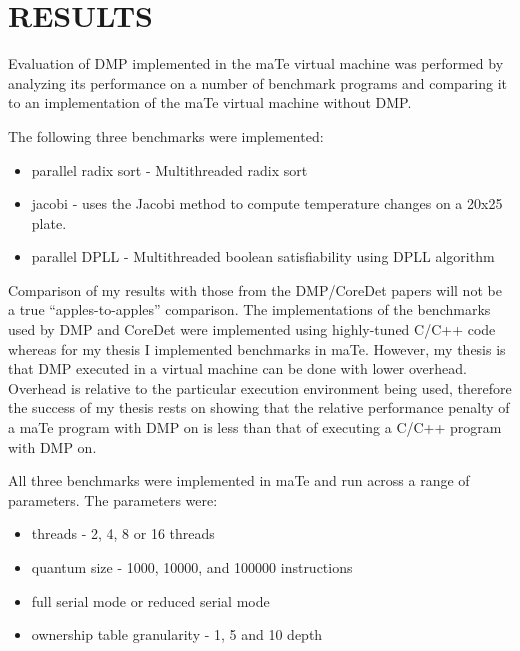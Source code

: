 \chapter{RESULTS}
\label{RESULTS}

Evaluation of DMP implemented in the maTe virtual machine was
performed by analyzing its performance on a number of benchmark
programs and comparing it to an implementation of the maTe virtual
machine without DMP.

The following three benchmarks were implemented:

\begin{itemize}
\item parallel radix sort - Multithreaded radix sort

\item jacobi - uses the Jacobi method to compute temperature changes
  on a 20x25 plate.

\item parallel DPLL - Multithreaded boolean satisfiability using DPLL
  algorithm
\end{itemize}

Comparison of my results with those from the DMP/CoreDet papers will
not be a true ``apples-to-apples'' comparison.  The implementations of
the benchmarks used by DMP \cite{dmp} and CoreDet \cite{coredet} were
implemented using highly-tuned C/C++ code whereas for my thesis I
implemented benchmarks in maTe.  However, my thesis is that DMP
executed in a virtual machine can be done with lower overhead.
Overhead is relative to the particular execution environment being
used, therefore the success of my thesis rests on showing that the
relative performance penalty of a maTe program with DMP on is less
than that of executing a C/C++ program with DMP on.

All three benchmarks were implemented in maTe and run across a range
of parameters.  The parameters were:

\begin{itemize}
\item threads - 2, 4, 8 or 16 threads

\item quantum size - 1000, 10000, and 100000 instructions

\item full serial mode or reduced serial mode

\item ownership table granularity - 1, 5 and 10 depth
\end{itemize}

